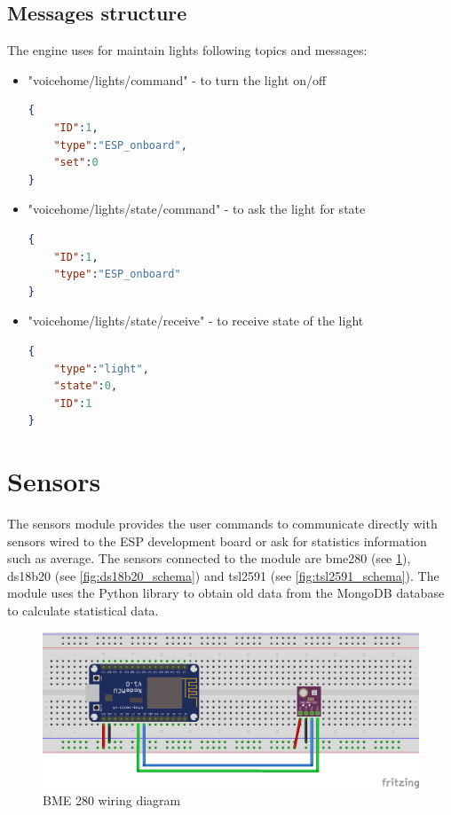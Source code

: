 \subsection{Messages structure}
The engine uses for maintain lights following topics and messages:

\begin{itemize}
    \item "voicehome/lights/command" - to turn the light on/off
    \begin{lstlisting}[language=json,firstnumber=1,caption={Structure of JSON message to turn on/off the light in module \textit{Lights}},captionpos=b,xleftmargin=1cm]
{
    "ID":1,
    "type":"ESP_onboard",
    "set":0
}
    \end{lstlisting}
    \item "voicehome/lights/state/command" - to ask the light for state
    \begin{lstlisting}[language=json,firstnumber=1,caption={Structure of JSON message to asking for the state of the light in module \textit{Lights}},captionpos=b,xleftmargin=1cm]
{
    "ID":1,
    "type":"ESP_onboard"
}
    \end{lstlisting}
    \item "voicehome/lights/state/receive" - to receive state of the light
    \begin{lstlisting}[language=json,firstnumber=1,caption={Structure of JSON message to receive state of the light in module \textit{Lights}},captionpos=b,xleftmargin=1cm]
{
    "type":"light",
    "state":0,
    "ID":1
}
    \end{lstlisting}
\end{itemize}

\section{Sensors}

The sensors module provides the user commands to communicate directly with sensors wired to the ESP development board or ask for statistics information such as average. The sensors connected to the module are bme280 (see \cref{fig:bme280_schema}), ds18b20 (see \cref{fig:ds18b20_schema}) and tsl2591 (see \cref{fig:tsl2591_schema}). The module uses the Python library to obtain old data from the MongoDB database to calculate statistical data.

\begin{figure}[H]
	\centering
	\includegraphics[width=\textwidth]{img/bme280_schema.png}
	\caption{BME 280 wiring diagram}
	\label{fig:bme280_schema}
\end{figure}


